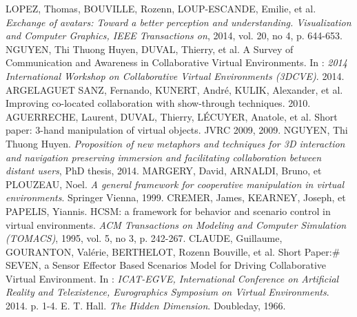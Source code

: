 \documentclass[11pt]{article}
\begin{document}
\begin{thebibliography}{1}
	 LOPEZ, Thomas, BOUVILLE, Rozenn, LOUP-ESCANDE, Emilie, et al. \textit{Exchange of avatars: Toward a better perception and understanding. Visualization and Computer Graphics, IEEE Transactions on}, 2014, vol. 20, no 4, p. 644-653.
	 NGUYEN, Thi Thuong Huyen, DUVAL, Thierry, et al. A Survey of Communication and Awareness in Collaborative Virtual Environments. In : \textit{2014 International Workshop on Collaborative Virtual Environments (3DCVE)}. 2014.
	 ARGELAGUET SANZ, Fernando, KUNERT, André, KULIK, Alexander, et al. Improving co-located collaboration with show-through techniques. 2010.
	 AGUERRECHE, Laurent, DUVAL, Thierry, LÉCUYER, Anatole, et al. Short paper: 3-hand manipulation of virtual objects. JVRC 2009, 2009.
	 NGUYEN, Thi Thuong Huyen. \textit{Proposition of new metaphors and techniques for 3D interaction and navigation preserving immersion and facilitating collaboration between distant users}, PhD thesis, 2014.
	 MARGERY, David, ARNALDI, Bruno, et PLOUZEAU, Noel. \textit{A general framework for cooperative manipulation in virtual environments}. Springer Vienna, 1999.
	 CREMER, James, KEARNEY, Joseph, et PAPELIS, Yiannis. HCSM: a framework for behavior and scenario control in virtual environments. \textit{ACM Transactions on Modeling and Computer Simulation (TOMACS)}, 1995, vol. 5, no 3, p. 242-267.
	 CLAUDE, Guillaume, GOURANTON, Valérie, BERTHELOT, Rozenn Bouville, et al. Short Paper:\# SEVEN, a Sensor Effector Based Scenarios Model for Driving Collaborative Virtual Environment. In : \textit{ICAT-EGVE, International Conference on Artificial Reality and Telexistence, Eurographics Symposium on Virtual Environments}. 2014. p. 1-4.
	 E. T. Hall. \textit{The Hidden Dimension}. Doubleday, 1966.
\end{thebibliography}
\end{document}
